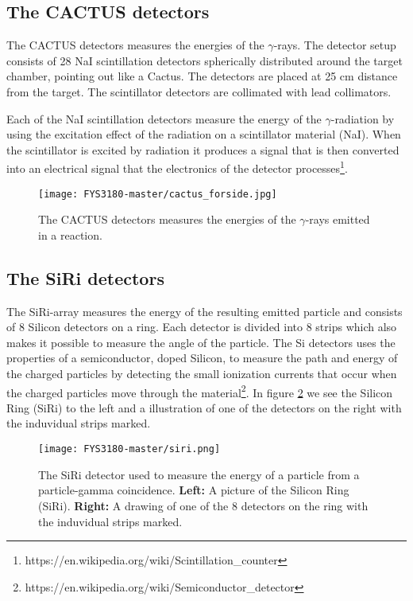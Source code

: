 \documentclass[paper=a4, fontsize=11pt]{scrartcl} %
\begin{document}
\subsection*{The CACTUS detectors}


The CACTUS detectors measures the energies of the $\gamma$-rays. The detector setup consists of 28 NaI scintillation detectors spherically distributed around the target chamber, pointing out like a Cactus. The detectors are placed at 25 cm distance from the target. The scintillator detectors are collimated with lead collimators. 



Each of the NaI scintillation detectors  measure the energy of the $\gamma$-radiation by using the excitation effect of the radiation on a scintillator material (NaI). When the scintillator is excited by radiation it produces a signal that is then converted into an electrical signal that the electronics of the detector processes\footnote{https://en.wikipedia.org/wiki/Scintillation\_counter}. 




\begin{figure}[htp]
\centering
\texttt{[image: FYS3180-master/cactus\_forside.jpg]}
\caption{The CACTUS detectors measures the energies of the $\gamma$-rays emitted in a reaction.}
\label{fig: CACTUS}
\end{figure}


\subsection*{The SiRi detectors}


The SiRi-array measures the energy of the resulting emitted particle and consists of 8 Silicon detectors on a ring. Each detector is divided into 8 strips which also makes it possible to measure the angle of the particle. The Si detectors uses the properties of a semiconductor, doped Silicon, to measure the path and energy of the charged particles by detecting the small ionization currents that occur when the charged particles move through the material\footnote{https://en.wikipedia.org/wiki/Semiconductor\_detector}. In figure \ref{fig: siri} we see the Silicon Ring (SiRi) to the left and a illustration of one of the detectors on the right with the induvidual strips marked.
\begin{figure}[htp]
\centering
\texttt{[image: FYS3180-master/siri.png]}
\caption{The SiRi detector used to measure the energy of a particle from a particle-gamma coincidence. \textbf{Left:} A picture of the Silicon Ring (SiRi). \textbf{Right:} A drawing of one of the 8 detectors on the ring with the induvidual strips marked.}
\label{fig: siri}
\end{figure}
\end{document}
